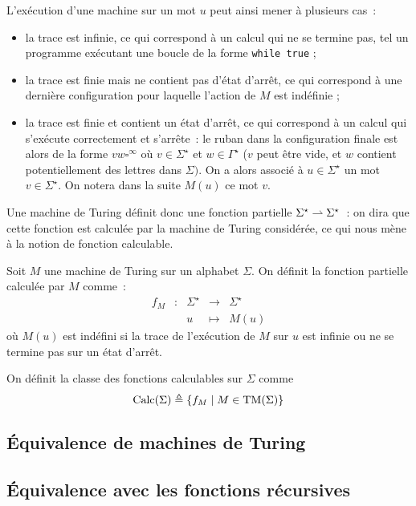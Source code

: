 L'exécution d'une machine sur un mot $u$ peut ainsi mener à plusieurs cas~:
\begin{itemize}
\item la trace est infinie, ce qui correspond à un calcul qui ne se termine pas,
  tel un programme exécutant une boucle de la forme \texttt{while true} ;
\item la trace est finie mais ne contient pas d'état d'arrêt, ce qui correspond
  à une dernière configuration pour laquelle l'action de $M$ est indéfinie ;
\item la trace est finie et contient un état d'arrêt, ce qui correspond à un
  calcul qui s'exécute correctement et s'arrête~: le ruban dans la configuration
  finale est alors de la forme $vw\square^\infty$ où $v \in \Sigma^\star$ et
  $w \in \Gamma^\star$ ($v$ peut être vide, et $w$ contient potentiellement
  des lettres dans $\Sigma)$. On a alors associé à $u\in\Sigma^\star$ un mot
  $v \in \Sigma^\star$. On notera dans la suite $M(u)$ ce mot $v$.
\end{itemize}

Une machine de Turing définit donc une fonction partielle
$\Sigma^\star \rightharpoonup \Sigma^\star$~: on dira que cette fonction est calculée
par la machine de Turing considérée, ce qui nous mène à la notion de fonction
calculable.

\begin{definition}
  Soit $M$ une machine de Turing sur un alphabet $\Sigma$. On définit la
  fonction partielle calculée par $M$ comme~:
  \[\begin{array}{ccccc}
  f_M & : & \Sigma^\star & \longrightarrow & \Sigma^\star\\
  & & u & \longmapsto & M(u)
  \end{array}\]
  où $M(u)$ est indéfini si la trace de l'exécution de $M$ sur $u$ est infinie
  ou ne se termine pas sur un état d'arrêt.
  
  On définit la classe des fonctions calculables sur $\Sigma$ comme
  \[\operatorname{Calc}(\Sigma)\triangleq \{ f_M\mid M \in \operatorname{TM}(\Sigma)\}\]
\end{definition}

\subsection{\'Equivalence de machines de Turing}

\subsection{\'Equivalence avec les fonctions récursives}

